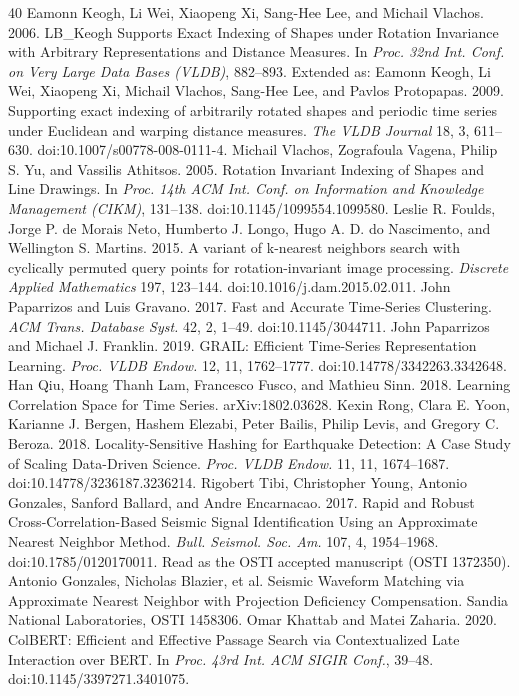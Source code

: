 \documentclass[sigconf]{acmart}
\begin{document}
\begin{thebibliography}{40}
 Eamonn Keogh, Li Wei, Xiaopeng Xi, Sang-Hee Lee, and Michail Vlachos. 2006. LB\_Keogh Supports Exact Indexing of Shapes under Rotation Invariance with Arbitrary Representations and Distance Measures. In \emph{Proc. 32nd Int. Conf. on Very Large Data Bases (VLDB)}, 882--893. Extended as: Eamonn Keogh, Li Wei, Xiaopeng Xi, Michail Vlachos, Sang-Hee Lee, and Pavlos Protopapas. 2009. Supporting exact indexing of arbitrarily rotated shapes and periodic time series under Euclidean and warping distance measures. \emph{The VLDB Journal} 18, 3, 611--630. doi:10.1007/s00778-008-0111-4.
 Michail Vlachos, Zografoula Vagena, Philip S. Yu, and Vassilis Athitsos. 2005. Rotation Invariant Indexing of Shapes and Line Drawings. In \emph{Proc. 14th ACM Int. Conf. on Information and Knowledge Management (CIKM)}, 131--138. doi:10.1145/1099554.1099580.
 Leslie R. Foulds, Jorge P. de Morais Neto, Humberto J. Longo, Hugo A. D. do Nascimento, and Wellington S. Martins. 2015. A variant of k-nearest neighbors search with cyclically permuted query points for rotation-invariant image processing. \emph{Discrete Applied Mathematics} 197, 123--144. doi:10.1016/j.dam.2015.02.011.
 John Paparrizos and Luis Gravano. 2017. Fast and Accurate Time-Series Clustering. \emph{ACM Trans. Database Syst.} 42, 2, 1--49. doi:10.1145/3044711.
 John Paparrizos and Michael J. Franklin. 2019. GRAIL: Efficient Time-Series Representation Learning. \emph{Proc. VLDB Endow.} 12, 11, 1762--1777. doi:10.14778/3342263.3342648.
 Han Qiu, Hoang Thanh Lam, Francesco Fusco, and Mathieu Sinn. 2018. Learning Correlation Space for Time Series. arXiv:1802.03628.
 Kexin Rong, Clara E. Yoon, Karianne J. Bergen, Hashem Elezabi, Peter Bailis, Philip Levis, and Gregory C. Beroza. 2018. Locality-Sensitive Hashing for Earthquake Detection: A Case Study of Scaling Data-Driven Science. \emph{Proc. VLDB Endow.} 11, 11, 1674--1687. doi:10.14778/3236187.3236214.
 Rigobert Tibi, Christopher Young, Antonio Gonzales, Sanford Ballard, and Andre Encarnacao. 2017. Rapid and Robust Cross-Correlation-Based Seismic Signal Identification Using an Approximate Nearest Neighbor Method. \emph{Bull. Seismol. Soc. Am.} 107, 4, 1954--1968. doi:10.1785/0120170011. Read as the OSTI accepted manuscript (OSTI 1372350).
 Antonio Gonzales, Nicholas Blazier, et al. Seismic Waveform Matching via Approximate Nearest Neighbor with Projection Deficiency Compensation. Sandia National Laboratories, OSTI 1458306.
 Omar Khattab and Matei Zaharia. 2020. ColBERT: Efficient and Effective Passage Search via Contextualized Late Interaction over BERT. In \emph{Proc. 43rd Int. ACM SIGIR Conf.}, 39--48. doi:10.1145/3397271.3401075.

\end{thebibliography}
\end{document}
